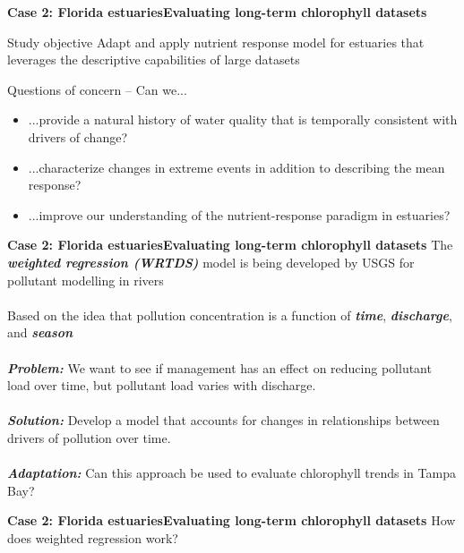 \documentclass[serif]{beamer}\usepackage[]{graphicx}\usepackage[]{color}
\newcommand{\emtxt}[1]{\textbf{\textit{#1}}}
\begin{document}
\begin{frame}{\textbf{Case 2: Florida estuaries}}{\textbf{Evaluating long-term chlorophyll datasets}}
\onslide<+->
\begin{block}{Study objective}
Adapt and apply nutrient response model for estuaries that leverages the descriptive capabilities of large datasets \scriptsize \cite{Beck15}
\end{block}
\vspace{0.2in}
\onslide<+->
Questions of concern -- Can we...
\begin{itemize}
\item ...provide a natural history of water quality that is temporally consistent with drivers of change?
\onslide<+->
\item ...characterize changes in extreme events in addition to describing the mean response?  
\onslide<+->
\item ...improve our understanding of the nutrient-response paradigm in estuaries?
\end{itemize}
\end{frame}

\begin{frame}{\textbf{Case 2: Florida estuaries}}{\textbf{Evaluating long-term chlorophyll datasets}}
\onslide<+->
The \emtxt{weighted regression (WRTDS)} model is being developed by USGS for pollutant modelling in rivers \cite{Hirsch10}\\~\\
Based on the idea that pollution concentration is a function of \emtxt{time}, \emtxt{discharge}, and \emtxt{season}\\~\\
\onslide<+->
\emtxt{Problem:} We want to see if management has an effect on reducing pollutant load over time, but pollutant load varies with discharge.\\~\\
\onslide<+->
\emtxt{Solution:} Develop a model that accounts for changes in relationships between drivers of pollution over time.\\~\\
\onslide<+->
\emtxt{Adaptation:} Can this approach be used to evaluate chlorophyll trends in Tampa Bay?
\end{frame}



\begin{frame}{\textbf{Case 2: Florida estuaries}}{\textbf{Evaluating long-term chlorophyll datasets}}
How does weighted regression work?
\begin{center}
\end{center}
\end{frame}
\end{document}

